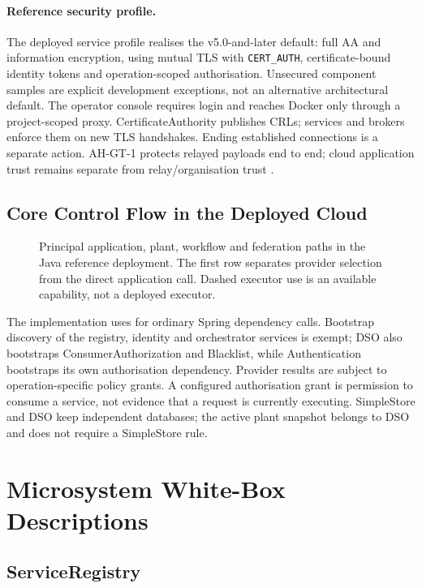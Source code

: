 \documentclass[a4paper]{arrowhead}
\begin{document}
\paragraph{Reference security profile.}
The deployed service profile realises the v5.0-and-later default: full AA and
information encryption, using mutual TLS with \texttt{CERT\_AUTH}, certificate-bound
identity tokens and operation-scoped authorisation. Unsecured component samples
are explicit development exceptions, not an alternative architectural default. The operator console requires login and reaches
Docker only through a project-scoped proxy. CertificateAuthority publishes CRLs;
services and brokers enforce them on new TLS handshakes. Ending established
connections is a separate action. AH-GT-1 protects relayed payloads end to end;
cloud application trust remains separate from relay/organisation trust
\cite{javaDeployment20261024,rustFederation20261019}.

\subsection{Core Control Flow in the Deployed Cloud}
\begin{figure}[htbp]
\centering

\caption{Principal application, plant, workflow and federation paths in the Java
reference deployment. The first row separates provider selection from the direct
application call. Dashed executor use is an available capability, not a deployed executor.}
\label{fig:java-service-paths}
\end{figure}
\FloatBarrier
The implementation uses  for ordinary
Spring dependency calls. Bootstrap discovery of the registry, identity and
orchestrator services is exempt; DSO also bootstraps ConsumerAuthorization and
Blacklist, while Authentication bootstraps its own authorisation dependency.
Provider results are subject to operation-specific policy grants. A configured
authorisation grant is permission to consume a service, not evidence that a
request is currently executing. SimpleStore and DSO keep independent databases;
the active plant snapshot belongs to DSO and does not require a SimpleStore rule.

\section{Microsystem White-Box Descriptions}
\label{sec:systems}

\subsection{ServiceRegistry}
\label{sec:sr}
\end{document}
